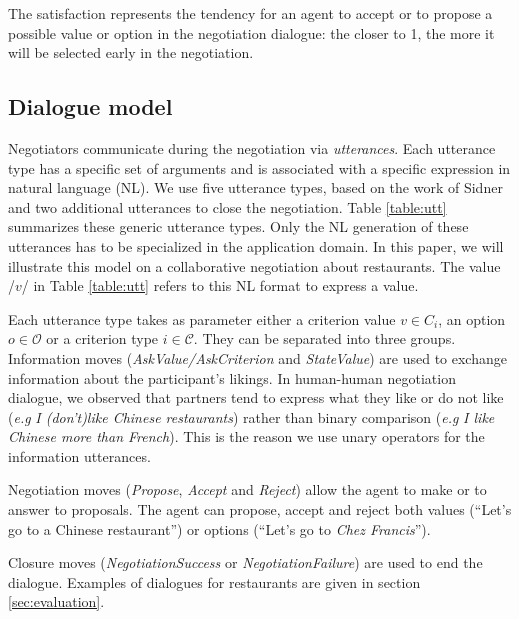 \documentclass{llncs}
\begin{document}
		\bigskip
		The satisfaction represents the tendency for an agent to accept or to propose a possible value or option in the negotiation dialogue: the closer to 1, the more it will be selected early in the negotiation.
		
		\subsection{Dialogue model}
		Negotiators communicate during the negotiation via \emph{utterances}. Each utterance type has a specific set of arguments and is associated with a specific expression in natural language (NL). We use five utterance types, based on the work of Sidner \cite{sidner1994artificial} and two additional utterances to close the negotiation. Table \ref{table:utt} summarizes these generic utterance types. Only the NL generation of these utterances has to be specialized in the application domain. In this paper, we will illustrate this model on a collaborative negotiation about restaurants. The value /$v$/ in Table \ref{table:utt} refers to this NL format to express a value.

		Each utterance type takes as parameter either a criterion value $v \in C_i$, an option $o \in \mathcal{O}$ or a criterion type $i \in \mathcal{C}$. They can be separated into three groups. Information moves (\textit{AskValue/AskCriterion} and \textit{StateValue}) are used to exchange information about the participant's likings. In human-human negotiation dialogue, we observed that partners tend to express what they like or do not like (\emph{e.g} \textit{I (don't)like Chinese restaurants})  rather than binary comparison (\emph{e.g} \textit{I like Chinese more than French}). This is the reason we use unary operators for the information utterances.
		
		Negotiation moves (\textit{Propose}, \textit{Accept} and \textit{Reject}) allow the agent to make or to answer to proposals. The agent can propose, accept and reject both values (``Let's go to a Chinese restaurant'') or options (``Let's go to \emph{Chez Francis}'').
		
		Closure moves (\textit{NegotiationSuccess} or \textit{NegotiationFailure}) are used to end the dialogue.
		Examples of dialogues for restaurants are given in section \ref{sec:evaluation}.
		
\end{document}

